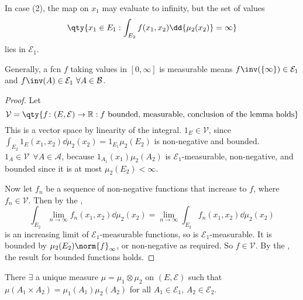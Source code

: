 \begin{remark}
	In case (2), the map on $x_1$ may evaluate to infinity, but the set of values
	\[ \qty{x_1 \in E_1 : \int_{E_2} f(x_1,x_2) \dd{\mu_2(x_2)} = \infty} \]
	lies in $\mathcal E_1$.

	Generally, a fcn $f$ taking values in $[0, \infty]$ is measurable means $f\inv(\{\infty\}) \in \mathcal{E}_1$ and $f\inv(A) \in \mathcal{E}_1 \ \forall A \in \mathcal{B}$.
\end{remark}

\begin{proof}
	Let
	\[ \mathcal V = \qty{f \colon (E,\mathcal E) \to \mathbb R : f \text{ bounded, measurable, conclusion of the lemma holds}} \]
	This is a vector space by linearity of the integral.
	$1_E \in \mathcal V$, since $\int_{E_2} 1_E(x_1,x_2) \dd{\mu_2(x_2)} = 1_{E_1} \mu_2(E_2)$ is non-negative and bounded.
	$1_A \in \mathcal V \ \ \forall A \in \mathcal A$, because $1_{A_1}(x_1) \mu_2(A_2)$ is $\mathcal E_1$-measurable, non-negative, and bounded since it is at most $\mu_2(E_2) < \infty$.

	Now let $f_n$ be a sequence of non-negative functions that increase to $f$, where $f_n \in \mathcal V$.
	Then by the ,
	\[ \int_{E_2} \lim_{n \to \infty} f_n(x_1, x_2) \dd{\mu_2(x_2)} = \lim_{n \to \infty} \int_{E_2} f_n(x_1, x_2) \dd{\mu_2(x_2)} \]
	is an increasing limit of $\mathcal E_1$-measurable functions, so is $\mathcal E_1$-measurable.
	It is bounded by $\mu_2(E_2) \norm{f}_\infty$, or non-negative as required.
	So $f \in \mathcal V$.
	By the , the result for bounded functions holds.

\end{proof}

\begin{theorem}
	There $\exists$ a unique measure $\mu = \mu_1 \otimes \mu_2$ on $(E, \mathcal E)$ such that $\mu(A_1 \times A_2) = \mu_1(A_1) \mu_2(A_2)$ for all $A_1 \in \mathcal E_1$, $A_2 \in \mathcal E_2$.
\end{theorem}

